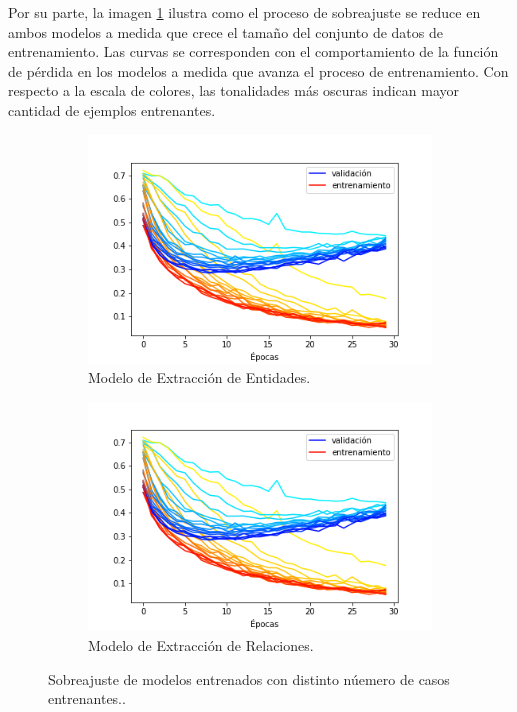 Por su parte, la imagen \ref{fig:color_scaled_train_graphs} ilustra como el proceso de sobreajuste se reduce en ambos modelos a medida que crece el tamaño del conjunto de datos de entrenamiento.
Las curvas se corresponden con el comportamiento de la función de pérdida en los modelos a medida que avanza el proceso de entrenamiento.
Con respecto a la escala de colores, las tonalidades más oscuras indican mayor cantidad de ejemplos entrenantes.

\begin{figure}[h!]
	\centering
	\begin{subfigure}{.5\linewidth}
		\centering
		\includegraphics[width=\linewidth]{Graphics/color_scaled_train_graphs.png}
		\caption{Modelo de Extracción de Entidades.}
	\end{subfigure}%
	\begin{subfigure}{.5\linewidth}
		\centering
		\includegraphics[width=\linewidth]{Graphics/color_scaled_train_graphs.png}
		\caption{Modelo de Extracción de Relaciones.}
	\end{subfigure}
	\caption{Sobreajuste de modelos entrenados con distinto núemero de casos entrenantes.. } \label{fig:color_scaled_train_graphs}
\end{figure}


